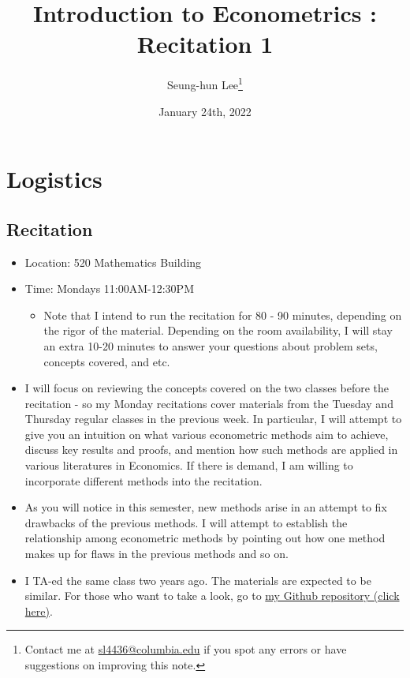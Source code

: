 \documentclass[12pt]{article}
\title{Introduction to Econometrics \ROM{2}: Recitation 1}
\theoremstyle{definition}
\theoremstyle{property}
\theoremstyle{assumption}
\theoremstyle{example}
\theoremstyle{comment}
\begin{document}
\linespread{1.25}
\onehalfspacing

\author{Seung-hun Lee\footnote{Contact me at \href{mailto:sl4436@columbia.edu}{sl4436@columbia.edu} if you spot any errors or have suggestions on improving this note.}}
\date{January 24th, 2022}
\maketitle
\thispagestyle{firstpage}

\section{Logistics}
\subsection{Recitation}
\begin{itemize}
\item Location: 520 Mathematics Building
\item Time: Mondays 11:00AM-12:30PM
\begin{itemize}
\item Note that I intend to run the recitation for 80 - 90 minutes, depending on the rigor of the material. Depending on the room availability, I will stay an extra 10-20 minutes to answer your questions about problem sets, concepts covered, and etc.  
\end{itemize}
\item I will focus on reviewing the concepts covered on the two classes before the recitation - so my Monday recitations cover materials from the Tuesday and Thursday regular classes in the previous week. In particular, I will attempt to give you an intuition on what various econometric methods aim to achieve, discuss key results and proofs, and mention how such methods are applied in various literatures in Economics. If there is demand, I am willing to incorporate different methods into the recitation. 
\item As you will notice in this semester, new methods arise in an attempt to fix drawbacks of the previous methods. I will attempt to establish the relationship among econometric methods by pointing out how one method makes up for flaws in the previous methods and so on. 
\item I TA-ed the same class two years ago. The materials are expected to be similar. For those who want to take a look, go to \href{https://github.com/seunghunlee918/phd_econometrics}{my Github repository (click here)}.
\end{itemize}
\end{document}
